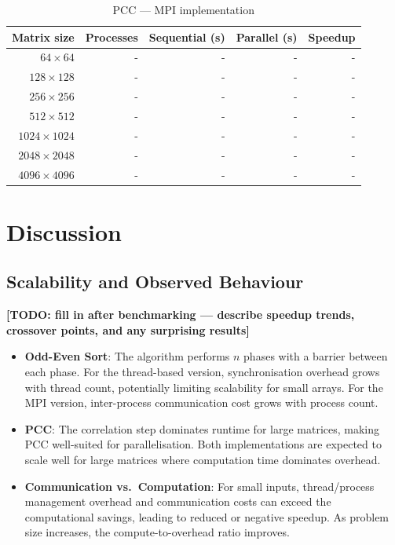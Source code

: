 \documentclass[11pt,a4paper]{article}
\begin{document}
\begin{table}[h]
\centering
\begin{tabular}{|r|r|r|r|r|}
\hline
\textbf{Matrix size} & \textbf{Processes} & \textbf{Sequential (s)} & \textbf{Parallel (s)} & \textbf{Speedup} \\
\hline
$64 \times 64$     & - & - & - & - \\
$128 \times 128$   & - & - & - & - \\
$256 \times 256$   & - & - & - & - \\
$512 \times 512$   & - & - & - & - \\
$1024 \times 1024$ & - & - & - & - \\
$2048 \times 2048$ & - & - & - & - \\
$4096 \times 4096$ & - & - & - & - \\
\hline
\end{tabular}
\caption{PCC --- MPI implementation}
\end{table}

\section{Discussion}

\subsection{Scalability and Observed Behaviour}

\textbf{[TODO: fill in after benchmarking --- describe speedup trends, crossover points, and any surprising results]}
\begin{itemize}
    \item \textbf{Odd-Even Sort}: The algorithm performs $n$ phases with a barrier between each
          phase. For the thread-based version, synchronisation overhead grows with thread count,
          potentially limiting scalability for small arrays. For the MPI version, inter-process
          communication cost grows with process count.
    \item \textbf{PCC}: The correlation step dominates runtime for large matrices, making PCC
          well-suited for parallelisation. Both implementations are expected to scale well for
          large matrices where computation time dominates overhead.
    \item \textbf{Communication vs.\ Computation}: For small inputs, thread/process management
          overhead and communication costs can exceed the computational savings, leading to
          reduced or negative speedup. As problem size increases, the compute-to-overhead ratio
          improves.
\end{itemize}
\end{document}
